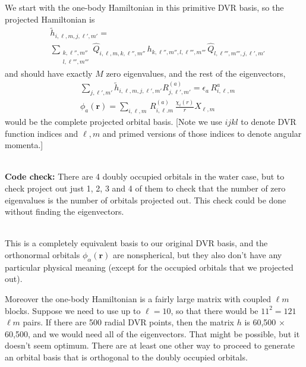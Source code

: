 \documentclass[%
pra%
,twocolumn%
,amssymb, nobibnotes, aps,
longbibliography
]{revtex4-1}
\begin{document}
We start with the one-body Hamiltonian in this primitive DVR basis, so the projected Hamiltonian is
\begin{equation}
\begin{split}
& \tilde{h}_{i,\ell,m, j, \ell',m'} = \\
& \sum_{\begin{matrix} k, \ell'',m'' \\ l,\ell''',m''' \end{matrix}} \hat{Q}_{i,\ell,m, k, \ell'',m''}\, h_{k,\ell'',m'', l, \ell''',m'''} \,\hat{Q}_{l,\ell''',m''', j, \ell',m'} 
 \end{split}
\end{equation}
and should have exactly $M$ zero eigenvalues, and the rest of the eigenvectors, 
\begin{equation}
\begin{split}
& \sum_{j,\ell',m'}\tilde{h}_{i,\ell,m, j, \ell',m'} R^{(a)}_{j,\ell',m'} = \epsilon_a \,R^{a}_{i,\ell,m} \\
&\phi_a(\mathbf{r}) = \sum_{i,\ell,m} \,R^{(a)}_{i,\ell.m}\,  \frac{\chi_i(r)}{r} X_{\ell,m}
 \end{split}
\end{equation}
would be the complete projected orbital basis.  [Note we use $i j k l$ to denote DVR function indices and $\ell, m$ and primed versions of those indices to denote angular momenta.]
\\
\

\noindent \textbf{Code check:} There are 4 doubly occupied orbitals in the water case, but to check project out just 1, 2, 3 and 4 of them to check that the number of zero eigenvalues is the number of orbitals projected out.  This check could be done without finding the eigenvectors.
\\
\

This is a completely equivalent basis to our original DVR basis, and the orthonormal orbitals $\phi_\alpha(\mathbf{r})$ are nonspherical, but they also don't have any particular physical meaning (except for the occupied orbitals that we projected out).  

Moreover the one-body Hamiltonian is a fairly large matrix with coupled $\ell m$ blocks. Suppose we need to use up to $\ell = 10$, so that there would be $11^2 = 121$ $\ell m$ pairs.  If there are 500 radial DVR points, then the matrix $h$ is 60,500 $\times$ 60,500, and we would need all of the eigenvectors.  That might be possible, but it doesn't seem optimum.   There are at least one other way to proceed to generate an orbital basis that is orthogonal to the doubly occupied orbitals.
\end{document}
